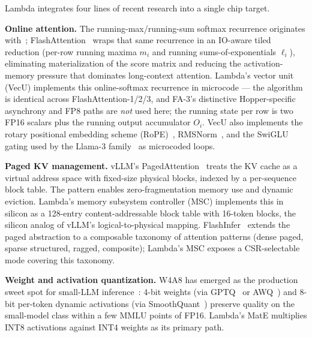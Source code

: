 \documentclass[conference]{IEEEtran}
\begin{document}
Lambda integrates four lines of recent research into a single chip target.

\textbf{Online attention.} The running-max/running-sum softmax recurrence originates with~\cite{onlinesoftmax}; FlashAttention~\cite{flashattention,flashattention2,flashattention3} wraps that same recurrence in an IO-aware tiled reduction (per-row running maxima $m_i$ and running sums-of-exponentials $\ell_i$), eliminating materialization of the score matrix and reducing the activation-memory pressure that dominates long-context attention. Lambda's vector unit (VecU) implements this online-softmax recurrence in microcode --- the algorithm is identical across FlashAttention-1/2/3, and FA-3's distinctive Hopper-specific asynchrony and FP8 paths are \emph{not} used here; the running state per row is two FP16 scalars plus the running output accumulator $O_i$. VecU also implements the rotary positional embedding scheme (RoPE)~\cite{rope}, RMSNorm~\cite{rmsnorm}, and the SwiGLU gating used by the Llama-3 family~\cite{swiglu} as microcoded loops.

\textbf{Paged KV management.} vLLM's PagedAttention~\cite{pagedattention} treats the KV cache as a virtual address space with fixed-size physical blocks, indexed by a per-sequence block table. The pattern enables zero-fragmentation memory use and dynamic eviction. Lambda's memory subsystem controller (MSC) implements this in silicon as a 128-entry content-addressable block table with 16-token blocks, the silicon analog of vLLM's logical-to-physical mapping. FlashInfer~\cite{flashinfer} extends the paged abstraction to a composable taxonomy of attention patterns (dense paged, sparse structured, ragged, composite); Lambda's MSC exposes a CSR-selectable mode covering this taxonomy.

\textbf{Weight and activation quantization.} W4A8 has emerged as the production sweet spot for small-LLM inference~\cite{w4a8_acl25}: 4-bit weights (via GPTQ~\cite{gptq} or AWQ~\cite{awq}) and 8-bit per-token dynamic activations (via SmoothQuant~\cite{smoothquant}) preserve quality on the small-model class within a few MMLU points of FP16. Lambda's MatE multiplies INT8 activations against INT4 weights as its primary path.
\end{document}
